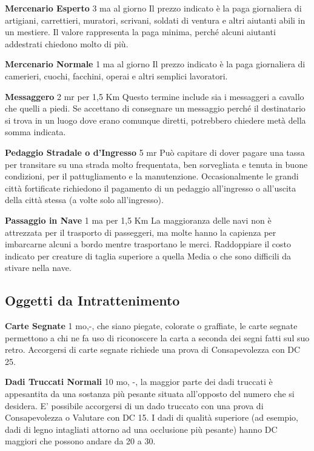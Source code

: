 \documentclass[a4paper,11pt,twoside,openany]{book}
\begin{document}
\textbf{Mercenario Esperto} 3 ma al giorno Il prezzo indicato è la paga giornaliera di artigiani, carrettieri, muratori, scrivani, soldati di ventura e altri aiutanti abili in un mestiere. Il valore rappresenta la paga minima, perché alcuni aiutanti addestrati chiedono molto di più.

\textbf{Mercenario Normale} 1 ma al giorno Il prezzo indicato è la paga giornaliera di camerieri, cuochi, facchini, operai e altri semplici lavoratori.

\textbf{Messaggero} 2 mr per 1,5 Km Questo termine include sia i messaggeri a cavallo che quelli a piedi. Se accettano di consegnare un messaggio perché il destinatario si trova in un luogo dove erano comunque diretti, potrebbero chiedere metà della somma indicata.

\textbf{Pedaggio Stradale o d'Ingresso} 5 mr Può capitare di dover pagare una tassa per transitare su una strada molto frequentata, ben sorvegliata e tenuta in buone condizioni, per il pattugliamento e la manutenzione. Occasionalmente le grandi città fortificate richiedono il pagamento di un pedaggio all'ingresso o all'uscita della città stessa (a volte solo all'ingresso).

\textbf{Passaggio in Nave} 1 ma per 1,5 Km La maggioranza delle navi non è attrezzata per il trasporto di passeggeri, ma molte hanno la capienza per imbarcarne alcuni a bordo mentre trasportano le merci. Raddoppiare il costo indicato per creature di taglia superiore a quella Media o che sono difficili da stivare nella nave.

\subsection{Oggetti da Intrattenimento}

\label{oggetti-da-intrattenimento}

\textbf{Carte Segnate} 1 mo,-, che siano piegate, colorate o graffiate, le carte segnate permettono a chi ne fa uso di riconoscere la carta a seconda dei segni fatti sul suo retro. Accorgersi di carte segnate richiede una prova di Consapevolezza con DC 25.

\textbf{Dadi Truccati Normali} 10 mo, -, la maggior parte dei dadi truccati è appesantita da una sostanza più pesante situata all'opposto del numero che si desidera. E' possibile accorgersi di un dado truccato con una prova di Consapevolezza o Valutare con DC 15. I dadi di qualità superiore (ad esempio, dadi di legno intagliati attorno ad una occlusione più pesante) hanno DC maggiori che possono andare da 20 a 30.
\end{document}
